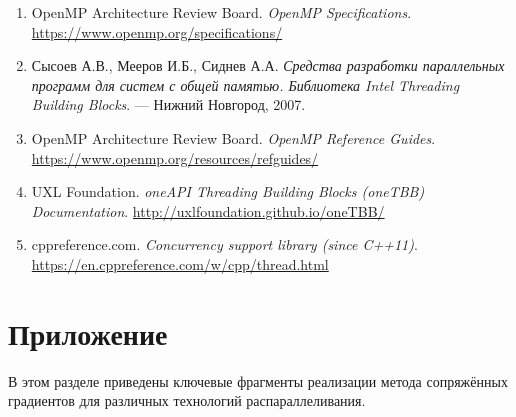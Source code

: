 \documentclass[12pt]{article}
\begin{document}
\begin{enumerate}
    \item OpenMP Architecture Review Board. \textit{OpenMP Specifications}. \url{https://www.openmp.org/specifications/}
    \item Сысоев А.В., Мееров И.Б., Сиднев А.А. \textit{Средства разработки параллельных программ для систем с общей памятью. Библиотека Intel Threading Building Blocks}. — Нижний Новгород, 2007.
    \item OpenMP Architecture Review Board. \textit{OpenMP Reference Guides}. \url{https://www.openmp.org/resources/refguides/}
    \item UXL Foundation. \textit{oneAPI Threading Building Blocks (oneTBB) Documentation}. \url{http://uxlfoundation.github.io/oneTBB/}
    \item cppreference.com. \textit{Concurrency support library (since C++11)}. \url{https://en.cppreference.com/w/cpp/thread.html}
\end{enumerate}
\newpage
\section*{Приложение}

В этом разделе приведены ключевые фрагменты реализации метода сопряжённых градиентов для различных технологий распараллеливания.
\end{document}
